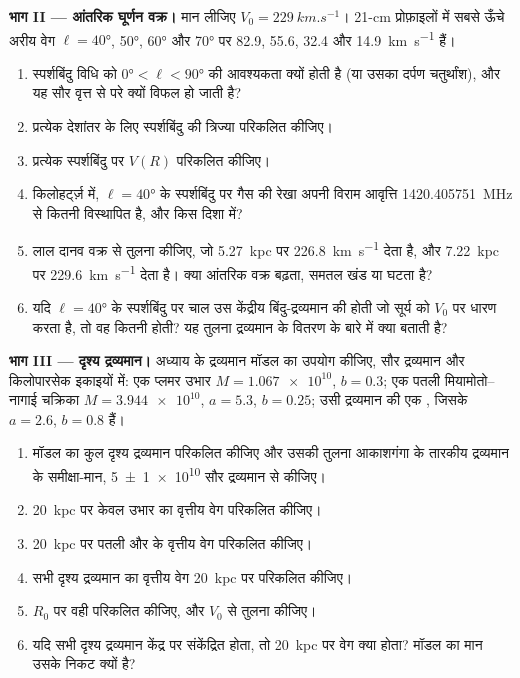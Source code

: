 \begin{problem}
\medskip\noindent\textbf{भाग II --- आंतरिक घूर्णन वक्र।} मान लीजिए
$V_0 = \qty{229}{km.s^{-1}}$। 21-cm प्रोफ़ाइलों में सबसे ऊँचे अरीय वेग
$\ell = \ang{40}$, \ang{50}, \ang{60} और \ang{70} पर
82.9, 55.6, 32.4 और \qty{14.9}{km.s^{-1}} हैं।
\begin{enumerate}[resume]
\item स्पर्शबिंदु विधि को $\ang{0} < \ell < \ang{90}$ की आवश्यकता क्यों होती है
  (या उसका दर्पण चतुर्थांश), और यह सौर वृत्त से परे क्यों विफल हो जाती है?
\item प्रत्येक देशांतर के लिए स्पर्शबिंदु की त्रिज्या परिकलित कीजिए।
\item प्रत्येक स्पर्शबिंदु पर $V(R)$ परिकलित कीजिए।
\item किलोहर्ट्ज़ में, $\ell = \ang{40}$ के स्पर्शबिंदु पर गैस की रेखा अपनी
  विराम आवृत्ति \qty{1420.405751}{MHz} से कितनी विस्थापित है,
  और किस दिशा में?
\item लाल दानव वक्र से तुलना कीजिए, जो \qty{5.27}{kpc} पर \qty{226.8}{km.s^{-1}} देता है,
  और \qty{7.22}{kpc} पर \qty{229.6}{km.s^{-1}} देता है। क्या आंतरिक
  वक्र बढ़ता, समतल खंड या घटता है?
\item यदि $\ell = \ang{40}$ के स्पर्शबिंदु पर चाल उस केंद्रीय बिंदु-द्रव्यमान की होती
  जो सूर्य को $V_0$ पर धारण करता है, तो वह कितनी होती?
  यह तुलना द्रव्यमान के वितरण के बारे में क्या बताती है?
\end{enumerate}

\medskip\noindent\textbf{भाग III --- दृश्य द्रव्यमान।} अध्याय के द्रव्यमान मॉडल का उपयोग कीजिए,
सौर द्रव्यमान और किलोपारसेक इकाइयों में: एक
प्लमर उभार $M = \num{1.067e10}$, $b = 0.3$; एक पतली मियामोतो--नागाई चक्रिका
$M = \num{3.944e10}$, $a = 5.3$, $b = 0.25$; उसी द्रव्यमान की एक ,
जिसके $a = 2.6$, $b = 0.8$ हैं।
\begin{enumerate}[resume]
\item मॉडल का कुल दृश्य द्रव्यमान परिकलित कीजिए और उसकी तुलना
  आकाशगंगा के तारकीय द्रव्यमान के समीक्षा-मान, \qty[separate-uncertainty=true]{5 \pm 1 e10}{}
  सौर द्रव्यमान से कीजिए।
\item \qty{20}{kpc} पर केवल उभार का वृत्तीय वेग परिकलित कीजिए।
\item \qty{20}{kpc} पर पतली और  के वृत्तीय वेग परिकलित कीजिए।
\item सभी दृश्य द्रव्यमान का वृत्तीय वेग
  \qty{20}{kpc} पर परिकलित कीजिए।
\item $R_0$ पर वही परिकलित कीजिए, और $V_0$ से तुलना कीजिए।
\item यदि सभी दृश्य द्रव्यमान केंद्र पर संकेंद्रित होता, तो
  \qty{20}{kpc} पर वेग क्या होता? मॉडल का मान उसके निकट क्यों है?
\end{enumerate}


\end{problem}
